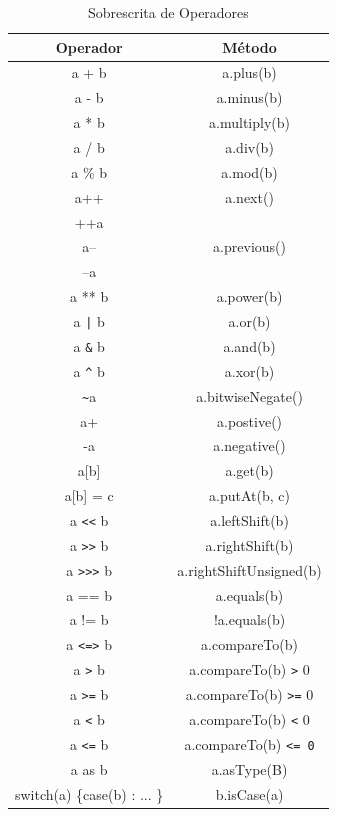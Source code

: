 \documentclass[12pt]{article}
\begin{document}
	\begin{table}
		\caption{Sobrescrita de Operadores}
		\label{tab:OperatorDefinition}
		\begin{tabular}{|c|c|}
		\hline
		{\bf Operador} & {\bf Método} \\
		\hline
			 a + b &  a.plus(b) \\
		\hline
			 a - b & a.minus(b) \\
		\hline
			 a * b & a.multiply(b) \\
		\hline
			 a / b &   a.div(b) \\
		\hline
			a \% b &   a.mod(b) \\
		\hline
			   a++ & \multicolumn{ 1}{|c|}{a.next()} \\
			   ++a & \multicolumn{ 1}{|c|}{} \\
		\hline
			   a-- & \multicolumn{ 1}{|c|}{a.previous()} \\
			   --a & \multicolumn{ 1}{|c|}{} \\
		\hline
			  a ** b & a.power(b) \\
		\hline
			   a \texttt{|} b &    a.or(b) \\
		\hline
			   a \texttt{\&} b &   a.and(b) \\
		\hline
			   a \texttt{\^} b &   a.xor(b) \\
		\hline
				\texttt{\~}a & a.bitwiseNegate() \\
		\hline
				a+ & a.postive() \\
		\hline
				-a & a.negative() \\
		\hline
			  a[b] &   a.get(b) \\
		\hline
		  a[b] = c & a.putAt(b, c) \\
		\hline
			a \texttt{<<} b & a.leftShift(b) \\
		\hline
			a \texttt{>>} b & a.rightShift(b) \\
		\hline
		   a \texttt{>>>} b & a.rightShiftUnsigned(b) \\
		\hline
			a == b & a.equals(b) \\
		\hline
			a != b & !a.equals(b) \\
		\hline
		   a \texttt{<=>} b & a.compareTo(b) \\
		\hline
			 a \texttt{>} b & a.compareTo(b) \texttt{>} 0 \\
		\hline
			a \texttt{>=} b & a.compareTo(b) \texttt{>=} 0 \\
		\hline
			 a \texttt{<} b & a.compareTo(b) \texttt{<} 0 \\
		\hline
			a \texttt{<=} b & a.compareTo(b) \texttt{<= 0} \\
		\hline
			a as b & a.asType(B) \\
		\hline
			switch(a) \{case(b) : ... \} 
			& b.isCase(a) \\
		\hline
		\end{tabular}  
	\end{table}
	
\end{document}
